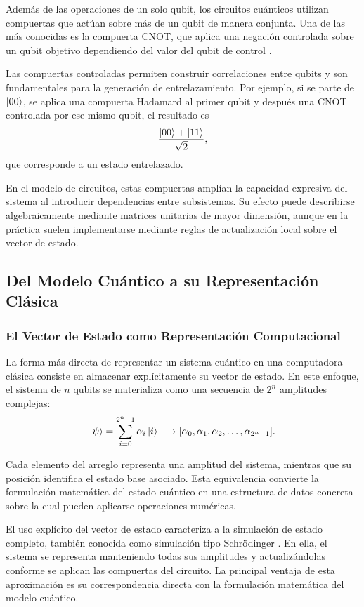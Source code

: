 Además de las operaciones de un solo qubit, los circuitos cuánticos utilizan compuertas que actúan sobre más de un qubit de manera conjunta. Una de las más conocidas es la compuerta CNOT, que aplica una negación controlada sobre un qubit objetivo dependiendo del valor del qubit de control \parencite{Nielsen2010}.

Las compuertas controladas permiten construir correlaciones entre qubits y son fundamentales para la generación de entrelazamiento. Por ejemplo, si se parte de $\ket{00}$, se aplica una compuerta Hadamard al primer qubit y después una CNOT controlada por ese mismo qubit, el resultado es
\[
    \frac{\ket{00} + \ket{11}}{\sqrt{2}},
\]
que corresponde a un estado entrelazado.

En el modelo de circuitos, estas compuertas amplían la capacidad expresiva del sistema al introducir dependencias entre subsistemas. Su efecto puede describirse algebraicamente mediante matrices unitarias de mayor dimensión, aunque en la práctica suelen implementarse mediante reglas de actualización local sobre el vector de estado.

\subsection{Del Modelo Cuántico a su Representación Clásica}

\subsubsection{El Vector de Estado como Representación Computacional}

La forma más directa de representar un sistema cuántico en una computadora clásica consiste en almacenar explícitamente su vector de estado. En este enfoque, el sistema de $n$ qubits se materializa como una secuencia de $2^n$ amplitudes complejas:
\[
    \ket{\psi} = \sum_{i=0}^{2^n-1} \alpha_i \ket{i}
    \longrightarrow
    [\alpha_0,\alpha_1,\alpha_2,\ldots,\alpha_{2^n-1}].
\]

Cada elemento del arreglo representa una amplitud del sistema, mientras que su posición identifica el estado base asociado. Esta equivalencia convierte la formulación matemática del estado cuántico en una estructura de datos concreta sobre la cual pueden aplicarse operaciones numéricas.

El uso explícito del vector de estado caracteriza a la simulación de estado completo, también conocida como simulación tipo Schr\"odinger \parencite{Jones2019}. En ella, el sistema se representa manteniendo todas sus amplitudes y actualizándolas conforme se aplican las compuertas del circuito. La principal ventaja de esta aproximación es su correspondencia directa con la formulación matemática del modelo cuántico.

